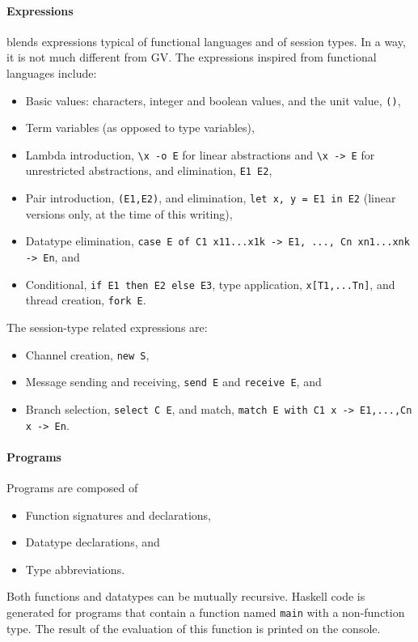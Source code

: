 \paragraph{Expressions}

\freest{} blends expressions typical of functional languages and of
session types. In a way, it is not much different from GV.
%
The expressions inspired from functional languages include:
%
\begin{itemize}
\item Basic values: characters, integer and boolean values, and the
  unit value, \lstinline|()|,
\item Term variables (as opposed to type variables),
\item Lambda introduction, \lstinline|\x -o E| for linear abstractions
  and \lstinline|\x -> E| for unrestricted abstractions, and
  elimination, \lstinline|E1 E2|,
\item Pair introduction, \lstinline|(E1,E2)|, and elimination,
  \lstinline|let x, y = E1 in E2| (linear versions only, at the time
  of this writing),
\item Datatype elimination,
  \lstinline|case E of C1 x11...x1k -> E1, ..., Cn xn1...xnk -> En|, and
\item Conditional, \lstinline|if E1 then E2 else E3|, type
  application, \lstinline|x[T1,...Tn]|, and thread creation,
  \lstinline|fork E|.
\end{itemize}

The session-type related expressions are:
%
\begin{itemize}
\item Channel creation, \lstinline|new S|,
\item Message sending and receiving, \lstinline|send E| and
  \lstinline|receive E|, and
\item Branch selection, \lstinline|select C E|, and match,
  \lstinline|match E with C1 x -> E1,...,Cn x -> En|.
\end{itemize}

\paragraph{Programs}

Programs are composed of
%
\begin{itemize}
\item Function signatures and
  declarations, 
\item Datatype declarations, and
\item Type abbreviations.
\end{itemize}

Both functions and datatypes can be mutually recursive. Haskell code
is generated for programs that contain a function named
\lstinline|main| with a non-function type. The result of the
evaluation of this function is printed on the console.

